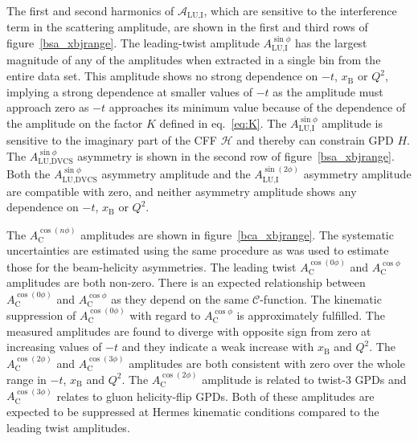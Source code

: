 \documentclass[11pt,a4paper]{article}
\begin{document}
The first and second harmonics of $\mathcal{A}_{\textrm{LU,I}}$, which are sensitive to the interference term in the scattering amplitude, are shown in the first and third rows of figure~\ref{bsa_xbjrange}. The leading-twist amplitude $A_{\textrm{LU,I}}^{\sin\phi}$ has the largest magnitude of any of the amplitudes when extracted in a single bin from the entire data set. This amplitude shows no strong dependence on $-t$, $x_{\textrm{B}}$ or $Q^{2}$, implying a strong dependence at smaller values of $-t$ as the amplitude must approach zero as $-t$ approaches its minimum value because of the dependence of the amplitude on the factor $K$ defined in eq.~\ref{eq:K}. The $A_{\textrm{LU,I}}^{\sin\phi}$ amplitude is sensitive to the imaginary part of the CFF $\mathcal{H}$ and thereby can constrain GPD $\textit{H}$. The $A_{\textrm{LU,DVCS}}^{\sin\phi}$ asymmetry is shown in the second row of figure~\ref{bsa_xbjrange}. Both the $A_{\textrm{LU,DVCS}}^{\sin\phi}$ asymmetry amplitude and the $A_{\textrm{LU,I}}^{\sin(2\phi)}$ asymmetry amplitude are compatible with zero, and neither asymmetry amplitude shows any dependence on $-t$, $x_{\textrm{B}}$ or $Q^{2}$.

The $A_{\textrm{C}}^{\cos(n\phi)}$ amplitudes are shown in figure~\ref{bca_xbjrange}. The systematic uncertainties are estimated using the same procedure as was used to estimate those for the beam-helicity asymmetries. The leading twist $A_{\textrm{C}}^{\cos(0\phi)}$ and $A_{\textrm{C}}^{\cos\phi}$ amplitudes are both non-zero. There is an expected relationship between $A_{\textrm{C}}^{\cos(0\phi)}$ and $A_{\textrm{C}}^{\cos\phi}$ as they depend on the same $\mathcal{C}$-function. The kinematic suppression of $A_{\textrm{C}}^{\cos(0\phi)}$ with regard to $A_{\textrm{C}}^{\cos\phi}$ is approximately fulfilled. The measured amplitudes are found to diverge with opposite sign from zero at increasing values of $-t$ and they indicate a weak increase with $x_{\textrm{B}}$ and $Q^{2}$. The $A_{\textrm{C}}^{\cos(2\phi)}$ and $A_{\textrm{C}}^{\cos(3\phi)}$ amplitudes are both consistent with zero over the whole range in $-t$, $x_{\textrm{B}}$ and $Q^{2}$. The $A_{\textrm{C}}^{\cos(2\phi)}$ amplitude is related to twist-3 GPDs and $A_{\textrm{C}}^{\cos(3\phi)}$ relates to gluon helicity-flip GPDs. Both of these amplitudes are expected to be suppressed at H{\sc ermes} kinematic conditions compared to the leading twist amplitudes. 
\end{document}
